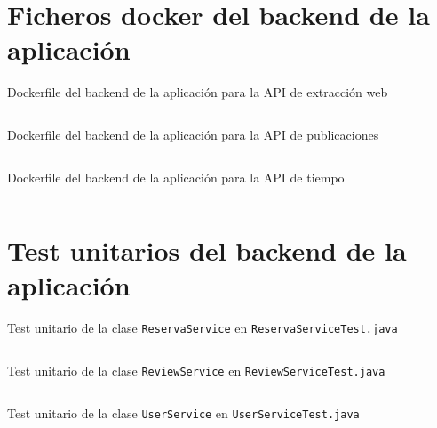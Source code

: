 \section{Ficheros \gls{docker} del backend de la aplicación}
\label{ap:docker}
\begin{longlisting}
    \caption{Dockerfile del backend de la aplicación para la API de extracción web}
    \inputminted{dockerfile}{../backend/despliegue/extraccion/Dockerfile}
    \label{lst:dockerfileBackendextraccion}
\end{longlisting}
\begin{longlisting}
    \caption{Dockerfile del backend de la aplicación para la API de publicaciones}
    \inputminted{dockerfile}{../backend/despliegue/publicacionesapi/Dockerfile}
    \label{lst:dockerfileBackendpublicaciones}
\end{longlisting}
\begin{longlisting}
    \caption{Dockerfile del backend de la aplicación para la API de tiempo}
    \inputminted{dockerfile}{../backend/despliegue/tiempo/Dockerfile}
    \label{lst:dockerfileBackendtiempo}
\end{longlisting}



\section{Test unitarios del backend de la aplicación}
\label{ap:test}
\begin{longlisting}
    \caption{Test unitario de la clase \texttt{ReservaService} en \texttt{ReservaServiceTest.java}}
    \inputminted[firstline=23]{java}{../backend/elrincondeeva/elrincondeeva/src/test/java/es/uv/hemal/elrincondeeva/services/ReservaServiceTest.java}
    \label{lst:reservaServiceTest}
\end{longlisting}
\begin{longlisting}
    \caption{Test unitario de la clase \texttt{ReviewService} en \texttt{ReviewServiceTest.java}}
    \inputminted[firstline=27]{java}{../backend/elrincondeeva/elrincondeeva/src/test/java/es/uv/hemal/elrincondeeva/services/ReviewServiceTest.java}
    \label{lst:reviewServiceTest}
\end{longlisting}
\begin{longlisting}
    \caption{Test unitario de la clase \texttt{UserService} en \texttt{UserServiceTest.java}}
    \inputminted[firstline=19]{java}{../backend/elrincondeeva/elrincondeeva/src/test/java/es/uv/hemal/elrincondeeva/services/UserServiceTest.java}
    \label{lst:userServiceTest}
\end{longlisting}

